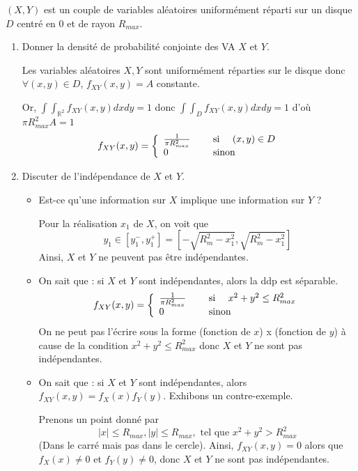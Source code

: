 \documentclass[main.tex]{subfiles}
\begin{document}
$(X,Y)$ est un couple de variables aléatoires uniformément réparti sur un disque $D$ centré en 0 et de rayon $R_{max}$.
\begin{enumerate}
\item Donner la densité de probabilité conjointe des VA $X$ et $Y$.

Les variables aléatoires $X,Y$ sont uniformément réparties sur le disque donc  $\forall (x,y) \in D$, $f_{XY}(x,y)=A $ constante.

Or, $\int\int_{\mathbb{R}^2} f_{XY}(x,y)dxdy = 1$ donc $\int\int_{D} f_{XY}(x,y)dxdy = 1$ d'où $\pi R_{max}^2A=1$
\[
f_{XY}(x,y) =
\left\{
\begin{array}{ll}
	\frac{1}{\pi R_{max}^2} & \quad\text{ si }\quad (x,y)\in D \\
	0 & \quad\text{ sinon}\quad
\end{array}		
\right. 
\]

\item Discuter de l'indépendance de $X$ et $Y$. 
	\begin{itemize}
	\item Est-ce qu'une information sur $X$ implique une information sur $Y$ ?
	
	Pour la réalisation $x_1$ de $X$, on voit que \[y_1\in[y_1^-,y_1^+]=[-\sqrt{R_m^2-x_1^2},\sqrt{R_m^2-x_1^2}]\] Ainsi, $X$ et $Y$ ne peuvent pas être indépendantes.

	\item On sait que : si $X$ et $Y$ sont indépendantes, alors la ddp est séparable.
	\begin{align*}
	f_{XY}(x,y) = 
	\left\{
	\begin{array}{ll}
	\frac{1}{\pi R_{max}^2} & \quad\text{ si }\quad x^2 + y^2 \leq R_{max}^2 \\
	0 & \quad\text{ sinon}\quad 
	\end{array}		
	\right.
	\end{align*}
	On ne peut pas l'écrire sous la forme (fonction de $x$) x (fonction de $y$) à  cause de la condition $x^2 + y^2 \leq R_{max}^2$ donc $X$ et $Y$ ne sont pas indépendantes.
	
	\item On sait que : si $X$ et $Y$ sont indépendantes, alors $f_{XY}(x,y)=f_X(x)f_Y(y)$. Exhibons un contre-exemple.
	
	Prenons un point donné par \[ |x|\leq R_{max},|y|\leq R_{max},\text{ tel que } x^2 + y^2 > R_{max}^2\] (Dans le carré mais pas dans le cercle). Ainsi, $f_{XY}(x,y)=0$ alors que $f_X(x)\neq0$ et $f_Y(y)\neq0$, donc $X$ et $Y$ ne sont pas indépendantes.
	

\end{itemize}
\end{enumerate}
\end{document}
